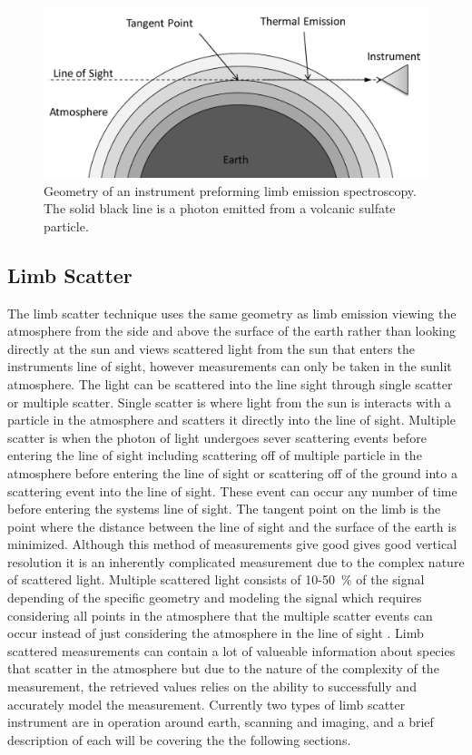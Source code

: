 \begin{figure}[h]
    \includegraphics[width=1.0\textwidth]{./Images/LimbEmissionGeometry.pdf}
    \caption[Limb Emission Geometry]{Geometry of an instrument preforming limb emission spectroscopy. The solid black line is a photon emitted from a volcanic sulfate particle.}
    \label{fig:LimbEmissionGeometry}
\end{figure}

\subsection{Limb Scatter}

The limb scatter technique uses the same geometry as limb emission viewing the atmosphere from the side and above the surface of the earth rather than looking directly at the sun and views scattered light from the sun that enters the instruments line of sight, however measurements can only be taken in the sunlit atmosphere. The light can be scattered into the line sight through single scatter or multiple scatter. Single scatter is where light from the sun is interacts with a particle in the atmosphere and scatters it directly into the line of sight. Multiple scatter is when the photon of light undergoes sever scattering events before entering the line of sight including scattering off of multiple particle in the atmosphere before entering the line of sight or scattering off of the ground into a scattering event into the line of sight. These event can occur any number of time before entering the systems line of sight. The tangent point on the limb is the point where the distance between the line of sight and the surface of the earth is minimized. Although this method of measurements give good gives good vertical resolution it is an inherently complicated measurement due to the complex nature of scattered light. Multiple scattered light consists of 10-50~\% of the signal depending of the specific geometry  and modeling the signal which requires considering all points in the atmosphere that the multiple scatter events can occur instead of just considering the atmosphere in the line of sight \citep{Oikarinen1999}. Limb scattered measurements can contain a lot of valueable information about species that scatter in the atmosphere but due to the nature of the complexity of the measurement, the retrieved values relies on the ability to successfully and accurately model the measurement. Currently two types of limb scatter instrument are in operation around earth, scanning and imaging, and a brief description of each will be covering the the following sections.

